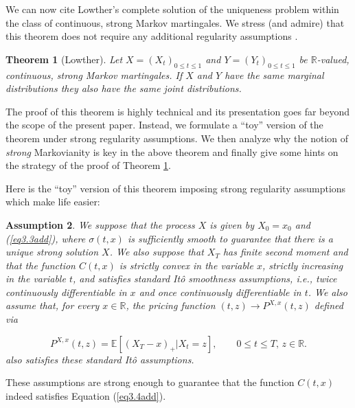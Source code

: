 \documentclass[11pt,a4paper]{article}%
\def\E{{\mathbb E}}
\def\R{{\mathbb R}}
\newtheorem{theorem}{Theorem}[section]
\newtheorem{assumption}[theorem]{Assumption}
\numberwithin{equation}{section}
\begin{document}
We can now cite Lowther's complete solution of the uniqueness problem within the class of continuous, strong Markov martingales. We stress (and admire) that this theorem does not require any additional regularity assumptions \cite[Theorem 1.2]{Lo08a}.

\begin{theorem}[Lowther] \label{uniqueness theorem}
Let $X= (X_t)_{0\le t\le1}$ and $Y= (Y_t)_{0\le t\le1}$ be  $\R$-valued, {\it continuous, strong Markov martingales}. 
If  $X$ and $Y$ have the same marginal distributions they also have the same joint distributions. 
\end{theorem}

The proof of this theorem is highly technical and its presentation goes far beyond the scope of the present paper. Instead, we formulate a ``toy'' version of the theorem under strong regularity assumptions. We then analyze why the notion of \textit{strong} Markovianity is key in the above theorem and finally give some hints on the strategy of the proof of Theorem \ref{uniqueness theorem}.

\vspace{1em}

Here is the ``toy'' version of this theorem imposing strong regularity assumptions which make life easier:

\begin{assumption}\label{Ass1}
 We suppose that the process $X$ is given by $X_0 = x_0$ and (\ref{eq3.3add}), where $\sigma(t,x)$ is sufficiently smooth to guarantee that there is a unique strong solution $X$. We also suppose that $X_T$ has finite second moment and that the function $C(t,x)$ is strictly convex in the variable $x$, strictly increasing in the variable $t$, and satisfies standard It\^o smoothness assumptions, i.e., twice continuously differentiable in $x$ and once continuously differentiable in $t$. We also assume that, for every $x \in \R$, the pricing function $(t,z) \to P^{X,x}(t,z)$ defined via

\begin{equation} \label{condadd}
P^{X,x}(t,z) = \E [(X_T -x)_+|X_t=z],   \qquad 0 \le t\le T, \, z \in \R.
\end{equation} 
also satisfies these standard It\^o assumptions.

\end{assumption}

These assumptions are strong enough to guarantee that the function $C(t,x)$ indeed satisfies Equation (\ref{eq3.4add}). 
\end{document}
